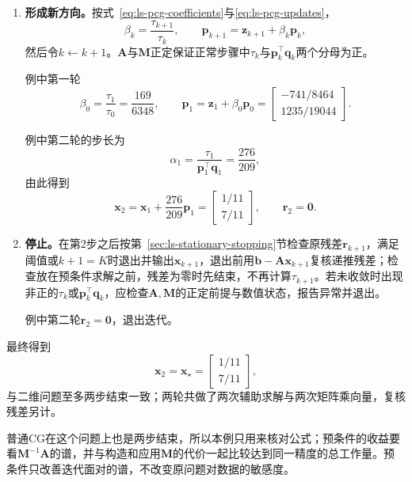 \begin{enumerate}
 \item \textbf{形成新方向。}按式~\eqref{eq:ls-pcg-coefficients}与\eqref{eq:ls-pcg-updates}，
 \[
  \beta_k=\frac{\tau_{k+1}}{\tau_k},\qquad \bm p_{k+1}=\bm z_{k+1}+\beta_k\bm p_k ,
 \]
 然后令$k\leftarrow k+1$。$\bm A$与$\bm M$正定保证正常步骤中$\tau_k$与$\bm p_k^\top\bm q_k$两个分母为正。

 例中第一轮
 \[
  \beta_0=\frac{\tau_1}{\tau_0}=\frac{169}{6348},\qquad
  \bm p_1=\bm z_1+\beta_0\bm p_0=\begin{bmatrix}-741/8464\\1235/19044\end{bmatrix}.
 \]

 例中第二轮的步长为
 \[
  \alpha_1=\frac{\tau_1}{\bm p_1^\top\bm q_1}=\frac{276}{209},
 \]
 由此得到
 \[
  \bm x_2=\bm x_1+\frac{276}{209}\bm p_1=\begin{bmatrix}1/11\\7/11\end{bmatrix},\qquad \bm r_2=\bm 0 .
 \]

 \item \textbf{停止。}在第2步之后按第~\ref{sec:ls-stationary-stopping}节检查原残差$\bm r_{k+1}$，满足阈值或$k+1=K$时退出并输出$\bm x_{k+1}$，退出前用$\bm b-\bm A\bm x_{k+1}$复核递推残差；检查放在预条件求解之前，残差为零时先结束，不再计算$\tau_{k+1}$。若未收敛时出现非正的$\tau_k$或$\bm p_k^\top\bm q_k$，应检查$\bm A,\bm M$的正定前提与数值状态，报告异常并退出。

 例中第二轮$\bm r_2=\bm 0$，退出迭代。
\end{enumerate}

最终得到
\[
 \bm x_2=\bm x_\star=\begin{bmatrix}1/11\\7/11\end{bmatrix},
\]
与二维问题至多两步结束一致；两轮共做了两次辅助求解与两次矩阵乘向量，复核残差另计。

普通CG在这个问题上也是两步结束，所以本例只用来核对公式；预条件的收益要看$\bm M^{-1}\bm A$的谱，并与构造和应用$\bm M$的代价一起比较达到同一精度的总工作量。预条件只改善迭代面对的谱，不改变原问题对数据的敏感度。
